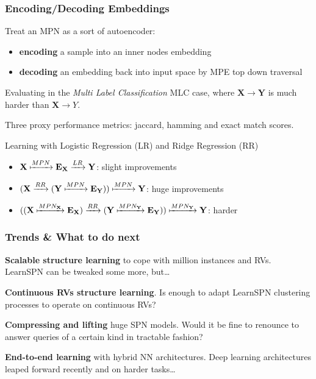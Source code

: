 \documentclass[10pt, t, xcolor={usenames,dvipsnames,svgnames}, compress]{beamer}
\begin{document}
\begin{frame}
  \frametitle{Encoding/Decoding Embeddings}
  Treat an MPN as a sort of autoencoder:
  \begin{itemize}
  \item \textbf{encoding} a sample into an inner nodes embedding
     \item \textbf{decoding} an embedding back into input space by MPE top
      down traversal
  \end{itemize}\bigskip
  
  Evaluating in the \emph{Multi Label Classification} MLC case, where
  $\mathbf{X}\rightarrow\mathbf{Y}$ is much harder than
  $\mathbf{X}\rightarrow Y$.\par
  Three proxy performance metrics: jaccard, hamming and exact match
  scores.\par
  Learning with Logistic Regression (LR)
  and Ridge Regression (RR)\bigskip
  \begin{itemize}
  \item $\mathbf{X}
    \xmapsto{MPN}\mathbf{E}_{\mathbf{X}}\xrightarrow{LR}\mathbf{Y}$:
    slight improvements
  \item
    $(\mathbf{X}\xrightarrow{RR}(\mathbf{Y}\xmapsto{MPN}\mathbf{E}_{\mathbf{Y}}))\xmapsto{MPN}\mathbf{Y}$:
    huge improvements
  \item
    $((\mathbf{X}\xmapsto{MPN_{\mathbf{X}}}\mathbf{E}_{\mathbf{X}})\xrightarrow{RR}(\mathbf{Y}\xmapsto{MPN_{\mathbf{Y}}}\mathbf{E}_{\mathbf{Y}}))\xmapsto{MPN_{\mathbf{Y}}}\mathbf{Y}$:
    harder
  \end{itemize}
\end{frame}





\begin{frame}
  \frametitle{Trends \& What to do next}
  \textbf{Scalable structure learning} to cope with million instances
  and RVs. LearnSPN can be tweaked some more, but\dots~\parencite{Krakovna2016}\par\bigskip
  
  \textbf{Continuous RVs structure learning}. Is enough to adapt
  LearnSPN clustering processes to operate on continuous RVs?\par\bigskip

  \textbf{Compressing and lifting} huge SPN models. Would it be fine
  to renounce to answer queries of a certain kind in tractable fashion?\par\bigskip

  \textbf{End-to-end learning} with hybrid NN architectures.
  Deep learning architectures leaped forward recently and on harder tasks\dots\par\bigskip
\end{frame}
\end{document}
